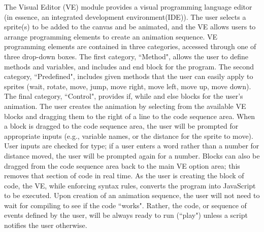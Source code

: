 \documentclass[a4paper]{article}
\begin{document}
The Visual Editor (VE) module provides a visual programming language editor (in essence, an integrated development environment(IDE)). The user selects a sprite(s) to be added to the canvas and be animated, and the VE allows users to arrange programming elements to create an animation sequence. VE programming elements are contained in three categories, accessed through one of three drop-down boxes. The first category, ``Method", allows the user to define methods and variables, and includes and end block for the program. The second category, ``Predefined", includes given methods that the user can easily apply to sprites (wait, rotate, move, jump, move right, move left, move up, move down). The final category, ``Control", provides if, while and else blocks for the user's animation. The user creates the animation by selecting from the available VE blocks and dragging them to the right of a line to the code sequence area. When a block is dragged to the code sequence area, the user will be prompted for appropriate inputs (e.g., variable names, or the distance for the sprite to move). User inputs are checked for type; if a user enters a word rather than a number for distance moved, the user will be prompted again for a number. Blocks can also be dragged from the code sequence area back to the main VE option area; this removes that section of code in real time. As the user is creating the block of code, the VE, while enforcing syntax rules, converts the program into JavaScript to be executed. Upon creation of an animation sequence, the user will not need to wait for compiling to see if the code ``works". Rather, the code, or sequence of events defined by the user, will be always ready to run (``play") unless a script notifies the user otherwise.
\end{document}
